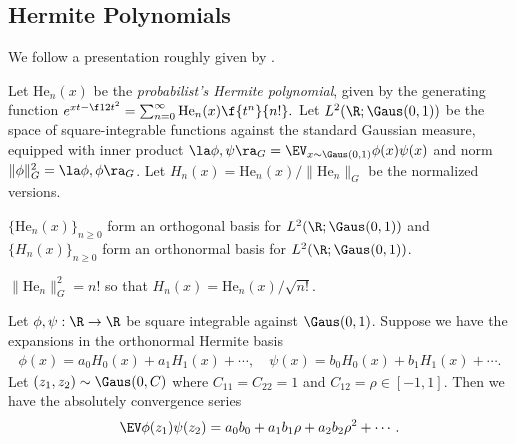 \documentclass[main.tex]{subfiles}
\begin{document}
\subsection{Hermite Polynomials}
We follow a presentation roughly given by \citet{odonnell_analysis_2014}.

\newcommand{\pHerm}{\mathrm{He}}
\newcommand{\Herm}{H}

\begin{defn}
Let $\pHerm_n(x)$ be the {\it probabilist's Hermite polynomial}, given by the generating function $e^{xt - \f 1 2 t^2} = \sum_{n=0}^\infty \pHerm_n(x) \f{t^n}{n!}.$
Let $L^2(\R; \Gaus(0, 1))$ be the space of square-integrable functions against the standard Gaussian measure, equipped with inner product $\la \phi, \psi \ra_G = \EV_{x \sim \Gaus(0, 1)} \phi(x) \psi(x)$ and norm $\|\phi\|_G^2 = \la \phi, \phi \ra_G$.
Let $\Herm_n(x) = \pHerm_n(x) / \|\pHerm_n\|_G$ be the normalized versions.
\end{defn}

\begin{fact}
$\{\pHerm_n(x)\}_{n \ge 0}$ form an orthogonal basis for $L^2(\R; \Gaus(0, 1))$ and $\{\Herm_n(x)\}_{n \ge 0}$ form an orthonormal basis for $L^2(\R; \Gaus(0, 1))$.
\end{fact}
\begin{fact}
$\|\pHerm_n\|_G^2 = n!$ so that $\Herm_n(x) = \pHerm_n(x)/\sqrt{n!}$.
\end{fact}

\begin{fact}\label{fact:hermiteInnerproduct}
  Let $\phi, \psi: \R \to \R$ be square integrable against $\Gaus(0, 1)$.
  Suppose we have the expansions in the orthonormal Hermite basis
  \begin{align*}
    \phi(x) = a_0 H_0(x) + a_{1} H_1(x) + \cdots,\quad
    \psi(x) = b_0 H_0(x) + b_{1} H_1(x) + \cdots.
  \end{align*}
  Let $(z_1, z_2) \sim \Gaus(0, C)$ where $C_{11} = C_{22} = 1$ and $C_{12} = \rho \in [-1, 1]$.
  Then we have the absolutely convergence series
  \begin{align*}
    \EV \phi(z_1)\psi(z_2) = a_0 b_0 + a_1 b_1 \rho + a_2 b_2 \rho^2 + \cdots.
  \end{align*}
\end{fact}
\end{document}
